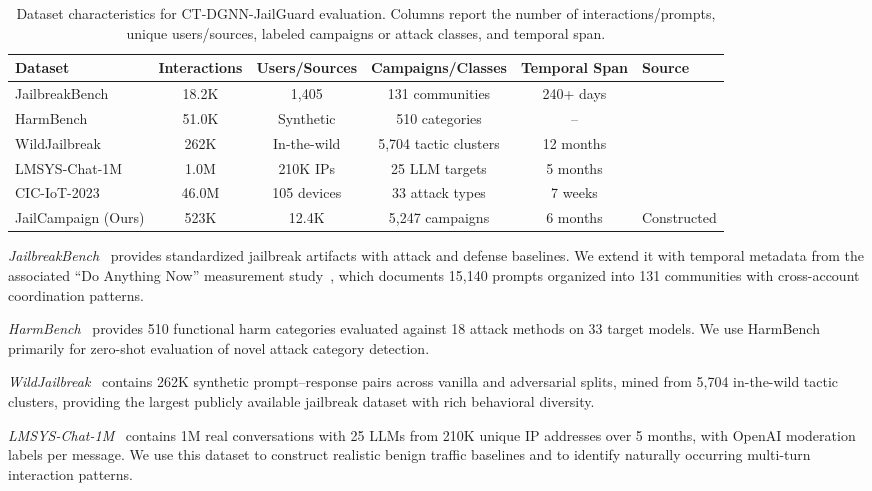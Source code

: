 \documentclass[journal]{IEEEtran}
\theoremstyle{plain}
\theoremstyle{definition}
\theoremstyle{remark}
\begin{document}
\begin{table}[t]
\centering
\caption{Dataset characteristics for CT-DGNN-JailGuard evaluation. Columns report the number of interactions/prompts, unique users/sources, labeled campaigns or attack classes, and temporal span.}
\label{tab:datasets}
\begin{tabular}{@{}lccccl@{}}
\toprule
\textbf{Dataset} & \textbf{Interactions} & \textbf{Users/Sources} & \textbf{Campaigns/Classes} & \textbf{Temporal Span} & \textbf{Source} \\
\midrule
JailbreakBench & 18.2K & 1,405 & 131 communities & 240+ days & \cite{chao2024jailbreakbench} \\
HarmBench & 51.0K & Synthetic & 510 categories & -- & \cite{mazeika2024harmbench} \\
WildJailbreak & 262K & In-the-wild & 5,704 tactic clusters & 12 months & \cite{jiang2024wildjailbreak} \\
LMSYS-Chat-1M & 1.0M & 210K IPs & 25 LLM targets & 5 months & \cite{zheng2024lmsyschat} \\
CIC-IoT-2023 & 46.0M & 105 devices & 33 attack types & 7 weeks & \cite{neto2023ciciot} \\
JailCampaign (Ours) & 523K & 12.4K & 5,247 campaigns & 6 months & Constructed \\
\bottomrule
\end{tabular}
\end{table}

\textit{JailbreakBench}~\cite{chao2024jailbreakbench} provides standardized jailbreak artifacts with attack and defense baselines. We extend it with temporal metadata from the associated ``Do Anything Now'' measurement study~\cite{shen2024dan}, which documents 15,140 prompts organized into 131 communities with cross-account coordination patterns.

\textit{HarmBench}~\cite{mazeika2024harmbench} provides 510 functional harm categories evaluated against 18 attack methods on 33 target models. We use HarmBench primarily for zero-shot evaluation of novel attack category detection.

\textit{WildJailbreak}~\cite{jiang2024wildjailbreak} contains 262K synthetic prompt--response pairs across vanilla and adversarial splits, mined from 5,704 in-the-wild tactic clusters, providing the largest publicly available jailbreak dataset with rich behavioral diversity.

\textit{LMSYS-Chat-1M}~\cite{zheng2024lmsyschat} contains 1M real conversations with 25 LLMs from 210K unique IP addresses over 5 months, with OpenAI moderation labels per message. We use this dataset to construct realistic benign traffic baselines and to identify naturally occurring multi-turn interaction patterns.
\end{document}

